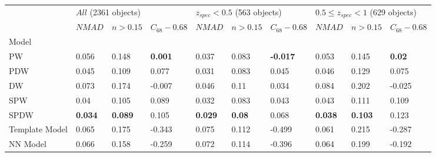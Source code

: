 \documentclass[fleqn,usenatbib]{mnras}
\begin{document}
\begin{table}
	\begin{tabular}{llllllllll}
            \hline
            {} & \multicolumn{3}{l}{$All$ (2361 objects)} & \multicolumn{3}{l}{$z_{spec} < 0.5$ (563 objects)} & \multicolumn{3}{l}{$0.5 \leq z_{spec} < 1$ (629 objects)} \\
            {} &               $NMAD$ &        $n>0.15$ & $C_{68} - 0.68$ &                         $NMAD$ &       $n>0.15$ &  $C_{68} - 0.68$ &                                $NMAD$ &        $n>0.15$ & $C_{68} - 0.68$ \\
            Model          &                      &                 &                 &                                &                &                  &                                       &                 &                 \\
            \hline
            PW             &                0.056 &           0.148 &  \textbf{0.001} &                          0.037 &          0.083 &  \textbf{-0.017} &                                 0.053 &           0.145 &   \textbf{0.02} \\
            PDW            &                0.045 &           0.109 &           0.077 &                          0.031 &          0.083 &            0.045 &                                 0.046 &           0.129 &           0.075 \\
            DW             &                0.073 &           0.174 &          -0.007 &                          0.046 &           0.11 &            0.034 &                                 0.084 &           0.202 &          -0.025 \\
            SPW            &                 0.04 &           0.105 &            0.089 &                          0.032 &          0.083 &           0.043 &                                 0.043 &           0.111 &            0.109 \\
            SPDW           &       \textbf{0.034} &  \textbf{0.089} &           0.105 &                 \textbf{0.029} &  \textbf{0.08} &            0.068 &                        \textbf{0.038} &  \textbf{0.103} &           0.123 \\
            Template Model &                0.065 &           0.175 &          -0.343 &                          0.075 &          0.112 &           -0.499 &                                 0.061 &           0.215 &          -0.287 \\
            NN Model       &                0.066 &           0.158 &          -0.259 &                          0.072 &          0.114 &           -0.396 &                                 0.064 &           0.199 &          -0.192 \\

\end{tabular}
\end{table}
\end{document}

